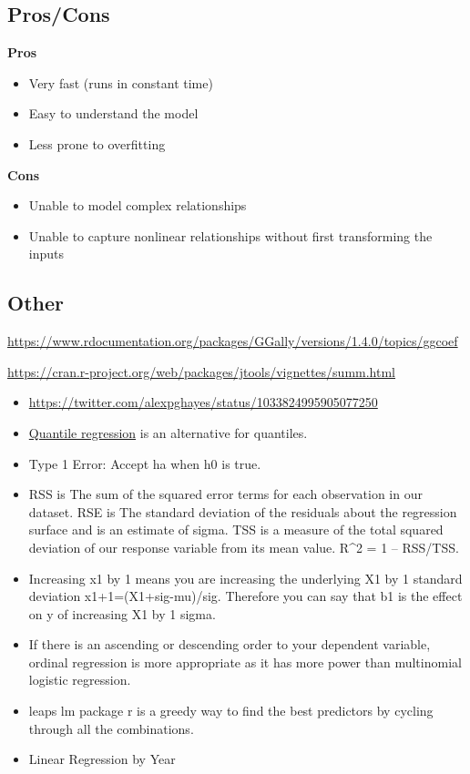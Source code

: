 \documentclass[]{book}
\begin{document}
\subsection{Pros/Cons}\label{proscons}

\textbf{Pros}

\begin{itemize}
\item
  Very fast (runs in constant time)
\item
  Easy to understand the model
\item
  Less prone to overfitting
\end{itemize}

\textbf{Cons}

\begin{itemize}
\item
  Unable to model complex relationships
\item
  Unable to capture nonlinear relationships without first transforming
  the inputs
\end{itemize}

\subsection{Other}\label{other-1}

\url{https://www.rdocumentation.org/packages/GGally/versions/1.4.0/topics/ggcoef}

\url{https://cran.r-project.org/web/packages/jtools/vignettes/summ.html}

\begin{itemize}
\item
  \url{https://twitter.com/alexpghayes/status/1033824995905077250}
\item
  \href{https://en.wikipedia.org/wiki/Quantile_regression}{Quantile
  regression} is an alternative for quantiles.
\item
  Type 1 Error: Accept ha when h0 is true.
\item
  RSS is The sum of the squared error terms for each observation in our
  dataset. RSE is The standard deviation of the residuals about the
  regression surface and is an estimate of sigma. TSS is a measure of
  the total squared deviation of our response variable from its mean
  value. R\^{}2 = 1 -- RSS/TSS.
\item
  Increasing x1 by 1 means you are increasing the underlying X1 by 1
  standard deviation x1+1=(X1+sig-mu)/sig. Therefore you can say that b1
  is the effect on y of increasing X1 by 1 sigma.
\item
  If there is an ascending or descending order to your dependent
  variable, ordinal regression is more appropriate as it has more power
  than multinomial logistic regression.
\item
  leaps lm package r is a greedy way to find the best predictors by
  cycling through all the combinations.
\item
  Linear Regression by Year
\end{itemize}
\end{document}
